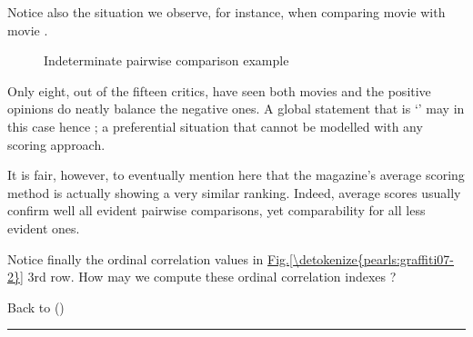 \documentclass[a4paper,12pt,english]{sphinxhowto}
\let\sphinxpxdimen\pdfpxdimen\else\newdimen\sphinxpxdimen
\begin{document}
\sphinxAtStartPar
Notice also the  situation we observe, for instance, when comparing movie  with movie .

\begin{sphinxVerbatim}[commandchars=\\\{\}]
\end{sphinxVerbatim}

\begin{figure}[H]
\centering
\capstart

\noindent\sphinxincludegraphics[width=400\sphinxpxdimen]{{graffiti07_6}.png}
\caption{Indeterminate pairwise comparison example}\label{\detokenize{pearls:id101}}\end{figure}

\sphinxAtStartPar
Only eight, out of the fifteen critics, have seen both movies and the positive opinions do neatly balance the negative ones. A global statement that  is ‘’   may in this case hence ; a preferential situation that cannot be modelled with any scoring approach.

\sphinxAtStartPar
It is fair, however, to eventually mention here that the  magazine’s average scoring method is actually showing a very similar ranking. Indeed, average scores usually confirm well all evident pairwise comparisons, yet  comparability for all less evident ones.

\sphinxAtStartPar
Notice finally the ordinal correlation  values in
\hyperref[\detokenize{pearls:graffiti07-2}]{Fig.\@ \ref{\detokenize{pearls:graffiti07-2}}} 3rd row. How may we compute these ordinal correlation indexes ?

\sphinxAtStartPar
Back to {\hyperref[\detokenize{pearls:pearls-label}]{}} ()


\bigskip\hrule\bigskip
\end{document}
